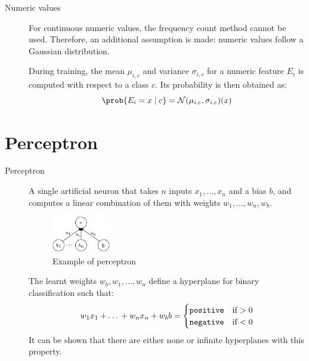 \begin{description}
    \item[Numeric values] 
        For continuous numeric values, the frequency count method cannot be used.
        Therefore, an additional assumption is made: numeric values follow a Gaussian distribution.

        During training, the mean $\mu_{i,c}$ and variance $\sigma_{i,c}$ for a numeric feature $E_i$ is computed with respect to a class $c$.
        Its probability is then obtained as:
        \[ \prob{E_i = x \mid c} = \mathcal{N}(\mu_{i,c}, \sigma_{i,c})(x) \]

\end{description}



\section{Perceptron}

\begin{description}
    \item[Perceptron] 
        A single artificial neuron that takes $n$ inputs $x_1, \dots, x_n$ and a bias $b$,
        and computes a linear combination of them with weights $w_1, \dots, w_n, w_b$.
        \begin{figure}[H]
            \centering
            \includegraphics[width=0.25\textwidth]{img/_perceptron.pdf}
            \caption{Example of perceptron}
        \end{figure}

        The learnt weights $w_b, w_1, \dots, w_n$ define a hyperplane for binary classification such that:
        \[
            w_1 x_1 + \text{\dots} + w_n x_n + w_b b = \begin{cases}
                \texttt{positive} & \text{if $> 0$} \\
                \texttt{negative} & \text{if $< 0$} \\
            \end{cases}
        \]
        It can be shown that there are either none or infinite hyperplanes with this property.
\end{description}


